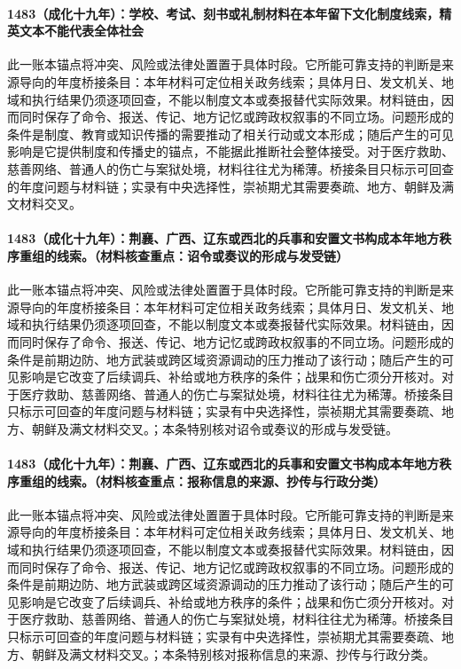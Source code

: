 \paragraph{1483（成化十九年）：学校、考试、刻书或礼制材料在本年留下文化制度线索，精英文本不能代表全体社会} 此一账本锚点将冲突、风险或法律处置置于具体时段。它所能可靠支持的判断是来源导向的年度桥接条目：本年材料可定位相关政务线索；具体月日、发文机关、地域和执行结果仍须逐项回查，不能以制度文本或奏报替代实际效果。材料链由，因而同时保存了命令、报送、传记、地方记忆或跨政权叙事的不同立场。问题形成的条件是制度、教育或知识传播的需要推动了相关行动或文本形成；随后产生的可见影响是它提供制度和传播史的锚点，不能据此推断社会整体接受。对于医疗救助、慈善网络、普通人的伤亡与案狱处境，材料往往尤为稀薄。桥接条目只标示可回查的年度问题与材料链；实录有中央选择性，崇祯期尤其需要奏疏、地方、朝鲜及满文材料交叉。

\paragraph{1483（成化十九年）：荆襄、广西、辽东或西北的兵事和安置文书构成本年地方秩序重组的线索。（材料核查重点：诏令或奏议的形成与发受链）} 此一账本锚点将冲突、风险或法律处置置于具体时段。它所能可靠支持的判断是来源导向的年度桥接条目：本年材料可定位相关政务线索；具体月日、发文机关、地域和执行结果仍须逐项回查，不能以制度文本或奏报替代实际效果。材料链由，因而同时保存了命令、报送、传记、地方记忆或跨政权叙事的不同立场。问题形成的条件是前期边防、地方武装或跨区域资源调动的压力推动了该行动；随后产生的可见影响是它改变了后续调兵、补给或地方秩序的条件；战果和伤亡须分开核对。对于医疗救助、慈善网络、普通人的伤亡与案狱处境，材料往往尤为稀薄。桥接条目只标示可回查的年度问题与材料链；实录有中央选择性，崇祯期尤其需要奏疏、地方、朝鲜及满文材料交叉。；本条特别核对诏令或奏议的形成与发受链。

\paragraph{1483（成化十九年）：荆襄、广西、辽东或西北的兵事和安置文书构成本年地方秩序重组的线索。（材料核查重点：报称信息的来源、抄传与行政分类）} 此一账本锚点将冲突、风险或法律处置置于具体时段。它所能可靠支持的判断是来源导向的年度桥接条目：本年材料可定位相关政务线索；具体月日、发文机关、地域和执行结果仍须逐项回查，不能以制度文本或奏报替代实际效果。材料链由，因而同时保存了命令、报送、传记、地方记忆或跨政权叙事的不同立场。问题形成的条件是前期边防、地方武装或跨区域资源调动的压力推动了该行动；随后产生的可见影响是它改变了后续调兵、补给或地方秩序的条件；战果和伤亡须分开核对。对于医疗救助、慈善网络、普通人的伤亡与案狱处境，材料往往尤为稀薄。桥接条目只标示可回查的年度问题与材料链；实录有中央选择性，崇祯期尤其需要奏疏、地方、朝鲜及满文材料交叉。；本条特别核对报称信息的来源、抄传与行政分类。

